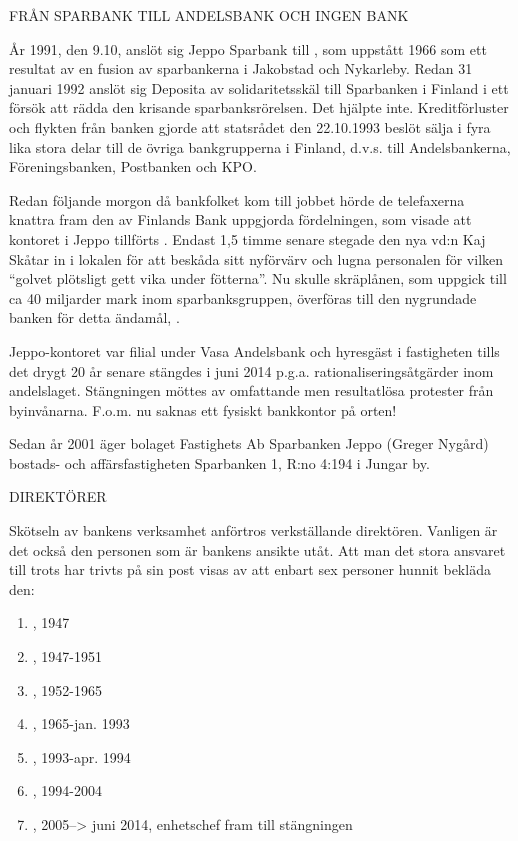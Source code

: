 FRÅN SPARBANK TILL ANDELSBANK OCH INGEN BANK

År 1991, den 9.10, anslöt sig Jeppo Sparbank till , som uppstått 1966 som ett resultat av en fusion av sparbankerna i Jakobstad och Nykarleby. Redan 31 januari 1992 anslöt sig Deposita av solidaritetsskäl till Sparbanken i Finland i ett försök att rädda den krisande sparbanksrörelsen. Det hjälpte inte. Kreditförluster och flykten från banken gjorde att statsrådet den 22.10.1993 beslöt sälja  i fyra lika stora delar till de övriga bankgrupperna i Finland, d.v.s. till Andelsbankerna, Föreningsbanken, Postbanken och KPO.

Redan följande morgon då bankfolket kom till jobbet hörde de telefaxerna knattra fram den av Finlands Bank uppgjorda fördelningen, som visade att kontoret i Jeppo tillförts . Endast 1,5 timme senare stegade den nya vd:n Kaj Skåtar in i lokalen för att beskåda sitt nyförvärv och lugna personalen för vilken ``golvet plötsligt gett vika under fötterna''. Nu skulle skräplånen, som uppgick till ca 40 miljarder mark inom sparbanksgruppen, överföras till den nygrundade banken för detta ändamål, .

Jeppo-kontoret var filial under Vasa Andelsbank och hyresgäst i fastigheten tills det drygt 20 år senare stängdes i juni 2014 p.g.a. rationaliseringsåtgärder inom andelslaget. Stängningen möttes av omfattande men resultatlösa protester från byinvånarna. F.o.m. nu saknas ett fysiskt bankkontor på orten!

Sedan år 2001 äger bolaget Fastighets Ab Sparbanken Jeppo (Greger Nygård) bostads- och affärsfastigheten Sparbanken 1, R:no 4:194 i Jungar by.


DIREKTÖRER

Skötseln av bankens verksamhet anförtros verkställande direktören. Vanligen är det också den personen som är bankens ansikte utåt. Att man det stora ansvaret till trots har trivts på sin post visas av att enbart sex personer hunnit bekläda den:
\begin{enumerate}
  \item {},  1947
  \item {},   1947-1951
  \item {},   1952-1965
  \item {},  1965-jan. 1993
  \item {},  1993-apr. 1994
  \item {},  1994-2004
  \item {}, 2005--> juni 2014, enhetschef fram till stängningen
\end{enumerate}


